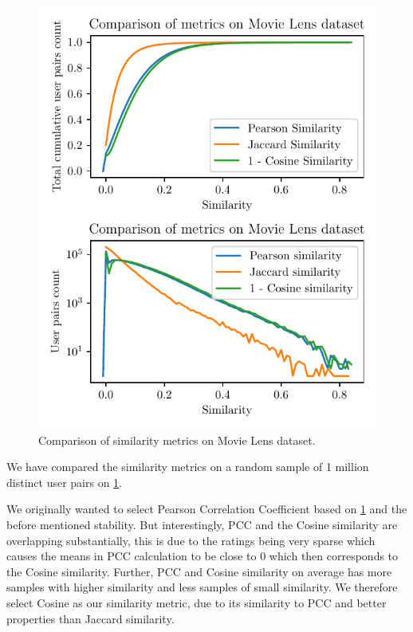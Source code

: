 \begin{figure}[ht!]
    \centering
    \includegraphics{img/figures/similarity_metrics.pdf}
    \caption{Comparison of similarity metrics on Movie Lens dataset.}
    \label{fig:similarity_metrics}
\end{figure}


We have compared the similarity metrics on a random sample of 1 million distinct user pairs on \ref{fig:similarity_metrics}.

We originally wanted to select Pearson Correlation Coefficient based on \ref{fig:similarity_metrics} and the before mentioned stability. But interestingly, PCC and the Cosine similarity are overlapping substantially, this is due to the ratings being very sparse which causes the means in PCC calculation to be close to 0 which then corresponds to the Cosine similarity. Further, PCC and Cosine similarity on average has more samples with higher similarity and less samples of small similarity. We therefore select Cosine as our similarity metric, due to its similarity to PCC and better properties than Jaccard similarity.


